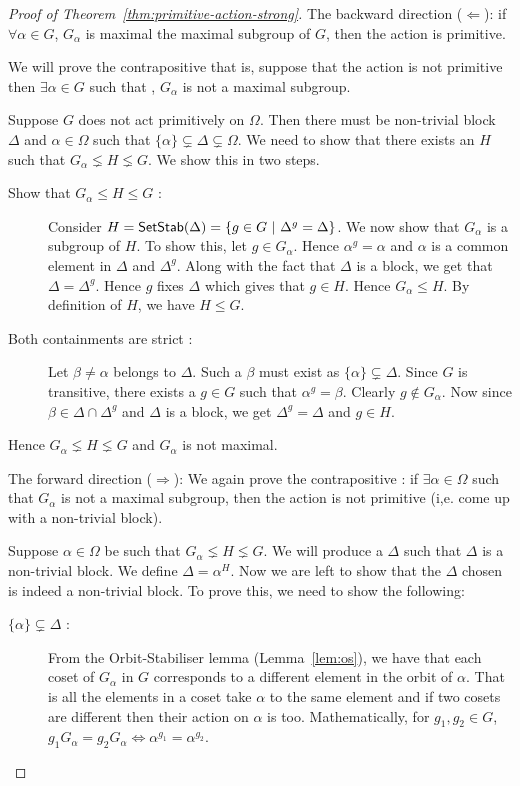 \begin{proof}[Proof of Theorem~\ref{thm:primitive-action-strong}]

The backward direction ($\Longleftarrow$): if $\forall \alpha \in G$,
$G_\alpha$ is maximal the maximal subgroup of $G$, then the action is
primitive.

We will prove the contrapositive that is, suppose that the action is not 
primitive then $\exists \alpha \in G$ such that , $G_\alpha$ is not a maximal 
subgroup.

Suppose $G$ does not act primitively on $\Omega$. Then there must be
non-trivial block $\Delta$ and $\alpha \in \Omega$ such that $\{\alpha\}
\subsetneq \Delta \subsetneq \Omega$. We need to show that there exists an $H$
such that $G_\alpha \lneq H \lneq G$. We show this in two steps.

\begin{description}
	\item [Show that $G_\alpha \le H \le G$ :]
Consider $H = {\sf SetStab}(\Delta) = \{g \in
G ~|~ \Delta^g =\Delta \}$. We now show that $G_\alpha$ is a subgroup of $H$.
To show this, let $g \in G_\alpha$. Hence $\alpha^g = \alpha$ and $\alpha$ is
a common element in $\Delta$ and $\Delta^g$. Along with the fact that $\Delta$
is a block, we get that $\Delta = \Delta^g$. Hence $g$ fixes $\Delta$ which
gives that $g \in H$.  Hence $G_\alpha \leq H$. By definition of $H$, we have $H \le G$.
	\item [Both containments are strict :]
Let $\beta \neq \alpha$ belongs to $\Delta$. Such a $\beta$ must exist as
$\{\alpha\} \subsetneq \Delta$. Since $G$ is transitive, there exists a  $g
\in G$ such that $\alpha^g = \beta$.  Clearly 
$g \notin G_\alpha$. Now since $\beta \in \Delta \cap \Delta^g$ and $\Delta$
is a block, we get $\Delta^g = \Delta$ and $g \in H$.
\end{description}
Hence $G_\alpha \lneq H \lneq G$ and $G_\alpha$ is not maximal.

The forward direction ($\Longrightarrow$):
We again prove the contrapositive : if $\exists \alpha \in \Omega$ such that 
$G_\alpha$ is not a maximal subgroup, then the action is not primitive (i,e.
come up with a non-trivial block).

Suppose $\alpha \in \Omega$ be such that $G_\alpha \lneq H \lneq G$.  We will
produce a $\Delta$ such that $\Delta$ is a non-trivial block. We define 
$\Delta = \alpha^H$. Now we are left to show that the $\Delta$ chosen is
indeed a non-trivial block. To prove this, we need to show the following:
\begin{description}
	\item[$\{\alpha\} \subsetneq \Delta$ :] 
		From the Orbit-Stabiliser lemma (Lemma~\ref{lem:os}), we have
		that each coset of $G_\alpha$ in $G$ corresponds to a
		different element in the orbit of $\alpha$.  That is all the
		elements in a coset take $\alpha$ to the same element and if
		two cosets are different then their action on $\alpha$ is too.
		Mathematically, for $g_1,g_2 \in G$, 
		$g_1G_\alpha = g_2G_\alpha \Leftrightarrow
		\alpha^{g_1} = \alpha^{g_2}$.


\end{description}
\end{proof}
